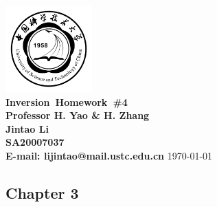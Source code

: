 \documentclass{article}
\makeatletter
\newcommand{\hmwkTitle}{Homework\ \#4}
\newcommand{\hmwkClass}{Inversion}
\newcommand{\hmwkClassInstructor}{Professor H. Yao \& H. Zhang}
\newcommand{\hmwkAuthorName}{\textbf{Jintao Li}}
\newcommand{\hmwkAuthorID}{\textbf{SA20007037}}
\newcommand{\hmwkAuthoremail}{\textbf{E-mail: lijintao@mail.ustc.edu.cn}}
\makeatother
\begin{document}
\begin{titlepage}

\begin{center}

\textcolor{ustcblue}{\includegraphics[width=0.25\textwidth]{./ustc_logo_fig.pdf} \\ [1cm]}
{ \Huge \bfseries \hmwkClass\ \hmwkTitle}\\[1cm]

\large \textbf{\hmwkClassInstructor} \\ [5cm]

\large \hmwkAuthorName \\ [0.25cm]
\large \hmwkAuthorID \\ [0.25cm]
\large \hmwkAuthoremail
\vfill
{\large \today}

\end{center}

\end{titlepage}

\begin{center}
\section{Chapter 3}
\end{center}
\end{document}
